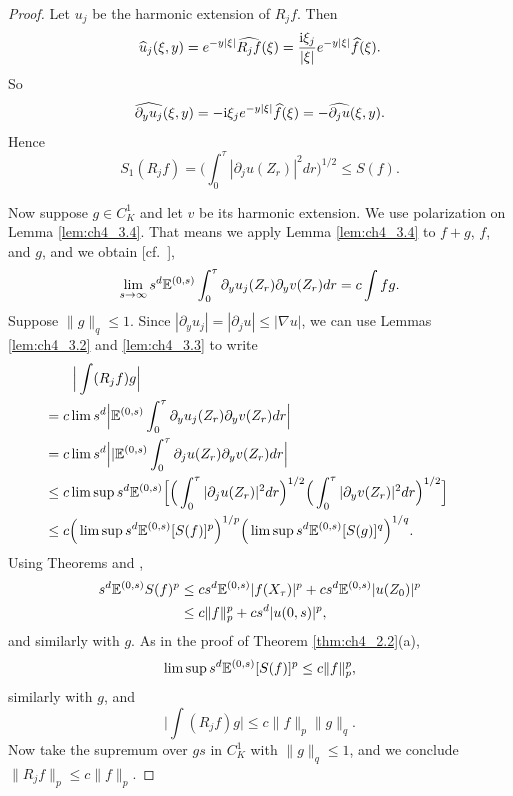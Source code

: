 \begin{proof}
Let $u_j$ be the harmonic extension of $R_j f$. Then
\[
    \widehat{u}_j(\xi,y) = e^{-y|\xi|}\widehat{R_j f}(\xi) = \frac{\mathrm{i} \xi_j}{|\xi|}e^{-y|\xi|}\widehat{f}(\xi).
\]
So
\begin{equation}\label{eq:ch4_3.11}
    \widehat{\partial_y u_j}(\xi,y) = -\mathrm{i}\xi_j e^{-y|\xi|}\widehat{f}(\xi) = -\widehat{\partial_j u}(\xi,y).
\end{equation}
Hence
\[
    S_1(R_j f) = \Big(\int_0^{\tau} |\partial_j u(Z_r)|^2dr\Big)^{1/2} \leq S(f).
\]

Now suppose $g \in C_K^1$ and let $v$ be its harmonic extension. We use polarization on Lemma \ref{lem:ch4_3.4}. That means we apply Lemma \ref{lem:ch4_3.4} to $f + g$, $f$, and $g$, and we obtain [cf.\ ],
\[
    \lim_{s\to\infty} s^d\mathbb{E}^{(0,s)} \int_0^{\tau} \partial_y u_j(Z_r)\partial_y v(Z_r)dr = c\int fg.
\]
Suppose $\|g\|_q\le 1$. Since $|\partial_y u_j|=|\partial_j u|\le |\nabla u|$, we can use Lemmas \ref{lem:ch4_3.2} and \ref{lem:ch4_3.3} to write
\begin{align}\label{eq:ch4_3.12}
    &\Big|\int(R_j f)g\Big| \\
    &\hspace{-2em}= c\lim s^d\Big|\E^{(0,s)} \int_0^{\tau} \partial_y u_j(Z_r)\partial_y v(Z_r)dr\Big| \notag \\
    &\hspace{-2em}= c\lim s^d\Big||\E^{(0,s)} \int_0^{\tau} \partial_j u(Z_r)\partial_y v(Z_r)dr\Big| \notag \\
    &\hspace{-2em}\leq c\limsup s^d\E^{(0,s)}\Big[\Big(\int_0^{\tau} |\partial_j u(Z_r)|^2dr\Big)^{1/2}\Big(\int_0^{\tau} |\partial_y v(Z_r)|^2dr\Big)^{1/2}\Big] \notag \\
    &\hspace{-2em}\leq c\Big(\limsup s^d\E^{(0,s)}[S(f)]^p\Big)^{1/p}\Big(\limsup s^d\E^{(0,s)}[S(g)]^q\Big)^{1/q}. \notag
\end{align}
Using Theorems  and ,
\begin{align*}
    s^d\mathbb{E}^{(0,s)}S(f)^p &\leq cs^d\mathbb{E}^{(0,s)}|f(X_\tau)|^p + cs^d\mathbb{E}^{(0,s)}|u(Z_0)|^p \\
    &\leq c\|f\|_p^p +cs^d|u(0,s)|^p,
\end{align*}
and similarly with $g$. As in the proof of Theorem \ref{thm:ch4_2.2}(a),
\[
    \limsup s^d\mathbb{E}^{(0,s)}[S(f)]^p \leq c\|f\|_p^p,
\]
similarly with $g$, and
\[
    \Big|\int(R_j f)g\Big| \leq c\|f\|_p\|g\|_q.
\]
Now take the supremum over $gs$ in $C_K^1$ with $\|g\|_q \leq 1$, and we conclude $\|R_j f\|_p \leq c\|f\|_p$.
\end{proof}

